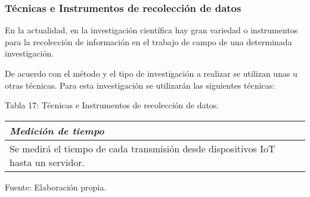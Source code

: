             \subsubsection{Técnicas e Instrumentos de recolección de datos}
                En la actualidad, en la investigación científica hay gran variedad o instrumentos para la recolección de información en el trabajo de campo de una determinada investigación.\par
                De acuerdo con el método y el tipo de investigación a realizar se utilizan unas u otras técnicas. Para esta investigación se utilizarán las siguientes técnicas:\par
                \begin{table}[h!]
                    \centering
                    { Tabla 17: Técnicas e Instrumentos de recolección de datos.}\par
                    \vskip 0.3cm
                    \begin{tabular}{|p{9cm}|} \hline
                        
                    
                    \textit{{\bf{Medición de tiempo}}}
                    \\ \hline
    
                    Se medirá el tiempo de cada transmisión desde dispositivos IoT hasta un servidor. 
                    \\ \hline
    
                    \end{tabular}
                    \begin{center}
                        \vskip -0.2cm
                        {\small{Fuente: Elaboración propia.}}
                    \end{center}                   
                \end{table}

